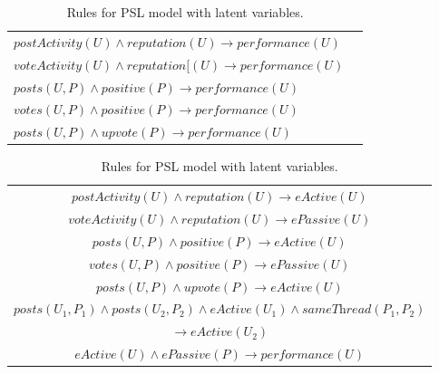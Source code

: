 \begin{table}
\parbox{.45\linewidth}{
\vspace{1.22cm}
	\begin{tabular}{ ll  }
    \hline
\tiny{$\textit{postActivity}(U) \wedge \textit{reputation}(U) \rightarrow \textit{performance}(U) $ }\\
\tiny{$\textit{voteActivity}(U) \wedge \textit{reputation}[(U) \rightarrow \textit{performance}(U)$ }\\
\tiny{$\textit{posts}(U, P) \wedge \textit{positive}(P) \rightarrow \textit{performance}(U)$ }\\
\tiny{$\textit{votes}(U, P) \wedge \textit{positive}(P) \rightarrow \textit{performance}(U)$ }\\
\tiny{$\textit{posts}(U, P) \wedge \textit{upvote}(P) \rightarrow \textit{performance}(U)$ }\\
    \hline
    \end{tabular}
      \caption{Rules for simple PSL model. }
  \label{table:simplepslmodel}
}
\parbox{.55\linewidth}{
	\begin{tabular}{ c }
    \hline
\tiny{$ \textit{postActivity}(U) \wedge \textit{reputation}(U) \rightarrow \textit{eActive}(U)$}\\
\tiny{$\textit{voteActivity}(U) \wedge \textit{reputation}(U) \rightarrow \textit{ePassive}(U)$} \\
\tiny{$ \textit{posts}(U, P) \wedge \textit{positive}(P) \rightarrow \textit{eActive}(U)$ }\\
\tiny{$\textit{votes}(U, P) \wedge \textit{positive}(P) \rightarrow \textit{ePassive}(U)$}\\
\tiny{$\textit{posts}(U, P) \wedge \textit{upvote}(P) \rightarrow \textit{eActive}(U)$}\\
\tiny{$\textit{posts}(U_1, P_1) \wedge \textit{posts}(U_2, P_2) \wedge \textit{eActive}(U_1) \wedge \textit{sameThread}(P_1, P_2)$}\\
\tiny{$\rightarrow \textit{eActive}(U_2)$}\\
\tiny{$\textit{eActive}(U) \wedge \textit{ePassive}(P) \rightarrow \textit{performance}(U)$}\\
    \hline
    \end{tabular}
      \caption{\noindent Rules for PSL model with latent variables.}
  \label{table:latentpslmodel}
}
\end{table}


